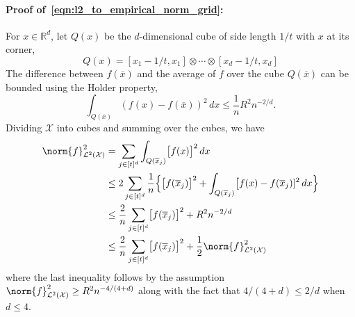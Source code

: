 \documentclass{article}
\newcommand{\Reals}{\mathbb{R}}
\newcommand{\1}{\mathbf{1}}
\newcommand{\Rd}{\Reals^d}
\newcommand{\Xset}{\mathcal{X}}
\newcommand{\Leb}{\mathcal{L}}
\newcommand{\ol}[1]{\overline{#1}}
\theoremstyle{alden}
\theoremstyle{aldenthm}
\theoremstyle{definition}
\theoremstyle{remark}
\begin{document}
\paragraph{Proof of~\eqref{eqn:l2_to_empirical_norm_grid}:}
For $x \in \Rd$, let $Q(x)$ be the $d$-dimensional cube of side length $1/t$ with $x$ at its corner,
\begin{equation*}
Q(x) = [x_1 - 1/t,x_1] \otimes \cdots \otimes [x_d - 1/t,x_d]
\end{equation*}
The difference between $f(\ol{x})$ and the average of $f$ over the cube $Q(\ol{x})$ can be bounded using the Holder property,
\begin{equation*}
\int_{Q(\ol{x})} (f(x) - f(\ol{x}))^2 \,dx \leq \frac{1}{n} R^2 n^{-2/d}.
\end{equation*}
Dividing $\Xset$ into cubes and summing over the cubes, we have
\begin{align*}
\norm{f}_{\Leb^2(\Xset)}^2 & = \sum_{j \in [t]^d} \int_{Q(\ol{x}_j)} \bigl[f(x)\bigr]^2 \,dx \\
& \leq 2 \sum_{j \in [t]^d} \frac{1}{n} \Bigl\{\bigl[f(\ol{x}_j)\bigr]^2 + \int_{Q(\ol{x}_j)} \bigl[f(x) - f(\ol{x}_j)]^2 \,dx \Bigr\} \\
& \leq \frac{2}{n}\sum_{j \in [t]^d} \bigl[f(\ol{x}_j)\bigr]^2 + R^2n^{-2/d} \\
& \leq \frac{2}{n}\sum_{j \in [t]^d} \bigl[f(\ol{x}_j)\bigr]^2 + \frac{1}{2}\norm{f}_{\Leb^2(\Xset)}^2
\end{align*}
where the last inequality follows by the assumption $\norm{f}_{\Leb^2(\Xset)}^2 \geq R^2n^{-4/(4 + d)}$ along with the fact that $4/(4 + d) \leq 2/d$ when $d \leq 4$.
\end{document}
